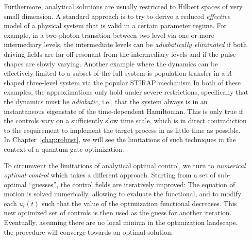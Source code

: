 Furthermore, analytical solutions are usually restricted to Hilbert spaces of very
small dimension. A standard approach is to try to derive a
reduced \emph{effective} model of a physical system that is valid in a certain
parameter regime. For example, in a two-photon transition between two level via
one or more intermediary levels, the intermediate levels can be
\emph{adiabatically eliminated} if both driving fields are far off-resonant
from the intermediary levels and if the pulse shapes are slowly varying. Another
example where the dynamics can be effectively limited to a subset
of the full system is population-transfer in a $\Lambda$-shaped
three-level system via the popular STIRAP mechanism
\cite{VitanovARPC2001}
In both of these examples, the approximations only hold under severe
restrictions, specifically that the dynamics
must be \emph{adiabatic}, i.e., that the system always is in an instantaneous
eigenstate of the time-dependent Hamiltonian.
This is only true if the controls vary on a sufficiently slow time scale, which
is in direct contradiction to the requirement to implement the target process
in as little time as possible.
In Chapter~\ref{chap:robust}, we will see the limitations of such techniques in
the context of a quantum gate optimization.

To circumvent the limitations of analytical optimal control, we turn to
\emph{numerical optimal control}
which takes a different approach.  Starting from a set of sub-optimal
``guesses'', the control fields are
iteratively improved: The equation of motion is solved numerically, allowing
to evaluate the functional, and to modify each
$u_i(t)$ such that the value of the optimization functional decreases. This new
optimized set of controls is then used as the guess for another iteration.
Eventually, assuming there are no local minima in the optimization landscape,
the procedure will converge towards an optimal solution.

